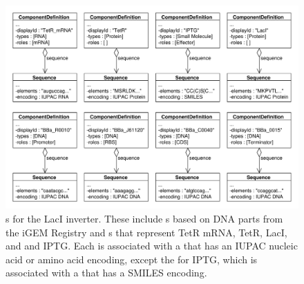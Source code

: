 \begin{figure}[ht]
\begin{center}
\includegraphics[width=\textwidth]{example_uml/toggle_1}
\caption[]{s for the LacI inverter. These include s based on DNA parts from the iGEM Registry and  s that represent TetR mRNA, TetR, LacI, and and IPTG. Each  is associated with a  that has an IUPAC nucleic acid or amino acid encoding, except the  for IPTG, which is associated with a  that has a SMILES encoding.}
\label{uml:ex_comp_defs}
\end{center}
\end{figure}

